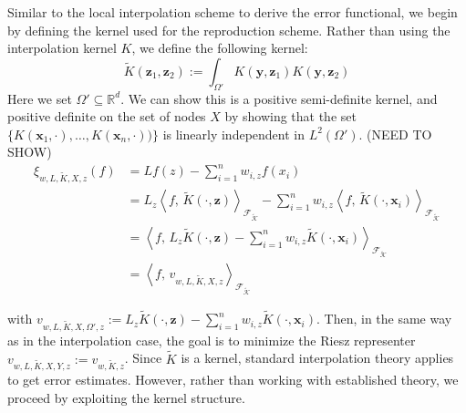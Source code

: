 \documentclass[11pt]{article}
\begin{document}
Similar to the local interpolation scheme to derive the error functional, we begin by defining the kernel used for the reproduction scheme. Rather than using the interpolation kernel $K$, we define the following kernel:
\begin{equation}
	\tilde{K}(\bm{z}_1,\bm{z}_2) := \int_{\Omega'} K(\bm{y}, \bm{z}_1) K(\bm{y}, \bm{z}_2)
\end{equation}
Here we set $\Omega' \subseteq \mathbb{R}^d$. We can show this is a positive semi-definite kernel, and positive definite on the set of nodes $X$ by showing that the set $\{ K(\bm{x}_1,\cdot), \hdots, K(\bm{x}_n,\cdot)) \}$ is linearly independent in $L^2(\Omega')$. (NEED TO SHOW)
\begin{align*}
	\xi_{w,L,\tilde{K},X,z}(f) &= Lf(z) - \sum_{i=1}^n w_{i,z} f(x_i)\\
	&= L_z \left \langle f, \, \tilde{K}(\cdot, \bm{z}) \right \rangle_{\mathcal{F_{\tilde{K}}}} - \sum_{i=1}^n w_{i,z} \left \langle f, \, \tilde{K}(\cdot, \bm{x}_i) \right \rangle_{\mathcal{F_{\tilde{K}}}}\\
	&= \left \langle f, \, L_z \tilde{K}(\cdot, \bm{z}) - \sum_{i=1}^n w_{i,z} \tilde{K}(\cdot, \bm{x}_i) \right \rangle_{\mathcal{F_{\tilde{K}}}}\\
	&= \left \langle f, \, v_{w,L,\tilde{K},X,z} \right \rangle_{\mathcal{F_{\tilde{K}}}}
\end{align*}

with $v_{w,L,\tilde{K},X,\Omega',z} := L_z \tilde{K}(\cdot, \bm{z}) - \sum_{i=1}^n w_{i,z} \tilde{K}(\cdot, \bm{x}_i)$. Then, in the same way as in the interpolation case, the goal is to minimize the Riesz representer $v_{w,L,\tilde{K},X,Y,z} := v_{w,\tilde{K},z}$. Since $\tilde{K}$ is a kernel, standard interpolation theory applies to get error estimates. However, rather than working with established theory, we proceed by exploiting the kernel structure.
\end{document}
